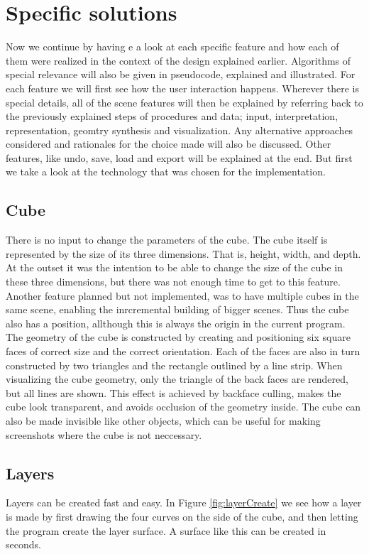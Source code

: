 \documentclass[a4paper,12pt]{report}
\begin{document}
\section{Specific solutions}
\label{subsec:indepth}

Now we continue by having e a look at each specific feature and how each of them were realized in the context of the design explained earlier. Algorithms of special relevance will also be given in pseudocode, explained and illustrated. For each feature we will first see how the user interaction happens. Wherever there is special details, all of the scene features will then be explained by referring back to the previously explained steps of procedures and data; input, interpretation, representation, geomtry synthesis and visualization. Any alternative approaches considered and rationales for the choice made will also be discussed. Other features, like undo, save, load and export will be explained at the end. But first we take a look at the technology that was chosen for the implementation.



\subsection{Cube}
There is no input to change the parameters of the cube. The cube itself is represented by the size of its three dimensions. That is, height, width, and depth. At the outset it was the intention to be able to change the size of the cube in these three dimensions, but there was not enough time to get to this feature. Another feature planned but not implemented, was to have multiple cubes in the same scene, enabling the inrcremental building of bigger scenes. Thus the cube also has a position, allthough this is always the origin in the current program. The geometry of the cube is constructed by creating and positioning six square faces of correct size and the correct orientation. Each of the faces are also in turn constructed by two triangles and the rectangle outlined by a line strip. When visualizing the cube geometry, only the triangle of the back faces are rendered, but all lines are shown. This effect is achieved by backface culling, makes the cube look transparent, and avoids occlusion of the geometry 
inside. The cube can also be made invisible like other objects, which can be useful for making screenshots where the cube is not neccessary.

\subsection{Layers}
Layers can be created fast and easy. In Figure \ref{fig:layerCreate} we see how a layer is made by first drawing the four curves on the side of the cube, and then letting the program create the layer surface. A surface like this can be created in seconds.
\end{document}
